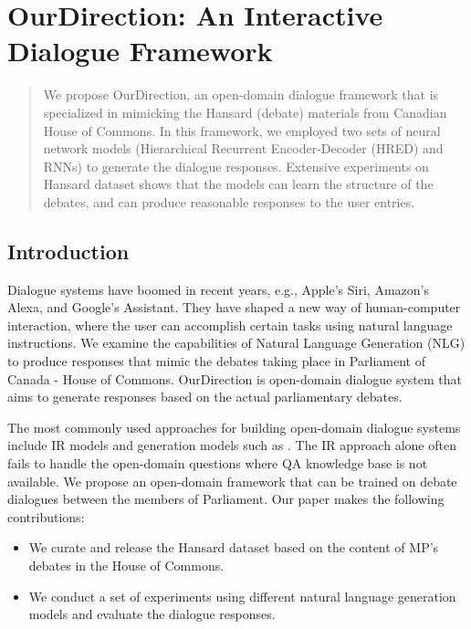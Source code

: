 \chapter{OurDirection: An Interactive Dialogue Framework}

\begin{abstract}
We propose OurDirection, an open-domain dialogue framework that is specialized in mimicking the Hansard (debate) materials from Canadian House of Commons. In this framework, we employed two sets of neural network models (Hierarchical Recurrent Encoder-Decoder (HRED) and RNNs) to generate the dialogue responses. Extensive experiments on Hansard dataset shows that the models can learn the structure of the debates, and can produce reasonable responses to the user entries. 
\end{abstract}

\section{Introduction}

Dialogue systems have boomed in recent years, e.g., Apple's Siri, Amazon's Alexa, and Google's Assistant. They have shaped a new way of human-computer interaction, where the user can accomplish certain tasks using natural language instructions. We examine the capabilities of Natural Language Generation (NLG) to produce responses that mimic the debates taking place in Parliament of Canada - House of Commons. OurDirection is open-domain dialogue system that aims to generate responses based on the actual parliamentary debates. 

The most commonly used approaches for building open-domain dialogue systems include IR models \cite{Yan2016DocChatAI} and generation models such as \cite{DBLP:journals/corr/BahdanauCB14}. The IR approach alone often fails to handle the open-domain questions where QA knowledge base is not available. We propose an open-domain framework that can be trained on debate dialogues between the members of Parliament. Our paper makes the following contributions:

\begin{itemize}
\item We curate and release the Hansard dataset based on the content of MP's debates in the House of Commons.
\item We conduct a set of experiments using different natural language generation models and evaluate the dialogue responses.
\end{itemize}


